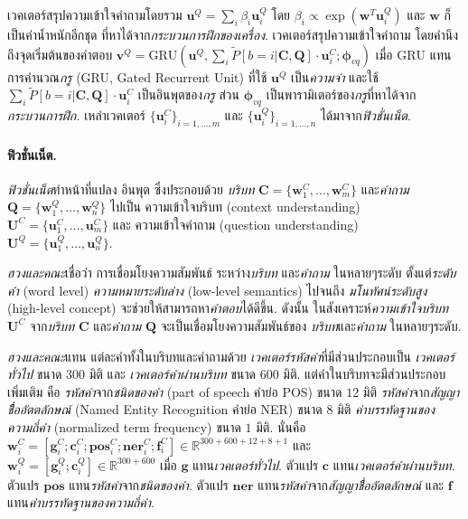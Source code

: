 เวคเตอร์สรุปความเข้าใจคำถามโดยรวม $\bm{u}^Q = \sum_i \beta_i \bm{u}_i^Q$ 
โดย $\beta_i \propto \exp{(\bm{w}^T \bm{u}_i^Q)}$
และ $\bm{w}$ ก็เป็นค่าน้ำหนักอีกชุด ที่หาได้จาก\textit{กระบวนการฝึกของเครื่อง}.
เวคเตอร์สรุปความเข้าใจคำถาม
โดยคำนึงถึงจุดเริ่มต้นของคำตอบ
$\bm{v}^Q = \mathrm{GRU}(\bm{u}^Q, \sum_i \tilde{P}[b=i|\bm{C}, \bm{Q}]
\cdot
 \bm{u}_i^C; \bm{\phi}_{vq})$
เมื่อ $\mathrm{GRU}$ แทนการคำนวณ\textit{กรู} (GRU, Gated Recurrent Unit\cite{ChoEtAl2014a})
ที่ใช้ $\bm{u}^Q$ เป็น\textit{ความจำ}
และใช้ $\sum_i \tilde{P}[b=i|\bm{C}, \bm{Q}] \cdot \bm{u}_i^C$ เป็นอินพุตของ\textit{กรู}
ส่วน $\bm{\phi}_{vq}$ %
%
เป็นพารามิเตอร์ของ\textit{กรู}ที่หาได้จาก\textit{กระบวนการฝึก.
}
%
เหล่าเวคเตอร์ $\{\bm{u}_i^C\}_{i=1, \ldots, m}$ และ
$\{\bm{u}_i^Q\}_{i=1, \ldots, n}$
ได้มาจาก\textit{ฟิวชั่นเน็ต}.

\paragraph{ฟิวชั่นเน็ต.}
\textit{ฟิวชั่นเน็ต}ทำหน้าที่แปลง
อินพุต ซึ่งประกอบด้วย
\textit{บริบท} $\bm{C} = \{\bm{w}_1^C, \ldots, \bm{w}_m^C \}$
และ\textit{คำถาม} $\bm{Q} = \{\bm{w}_1^Q, \ldots, \bm{w}_n^Q \}$
ไปเป็น
ความเข้าใจบริบท  (context understanding)
$\bm{U}^C = \{\bm{u}^C_1, \ldots, \bm{u}^C_m \}$
และ
ความเข้าใจคำถาม 
(question understanding) 
$\bm{U}^Q = \{\bm{u}^Q_1, \ldots, \bm{u}^Q_n \}$.

\textit{ฮวงและคณะ}\cite{HuangEtAl2017a}เชื่อว่า
การเชื่อมโยงความสัมพันธ์
ระหว่าง\textit{บริบท}
และ\textit{คำถาม}
ในหลายๆระดับ 
ตั้งแต่\textit{ระดับคำ} (word level)
\textit{ความหมายระดับล่าง} (low-level  semantics)
ไปจนถึง
\textit{มโนทัศน์ระดับสูง} (high-level concept)
จะช่วยให้สามารถหา\textit{คำตอบ}ได้ดีขึ้น.
%
ดังนั้น
ในสังเคราะห์\textit{ความเข้าใจบริบท}
$\bm{U}^C$
จาก\textit{บริบท} $\bm{C}$ 
และ\textit{คำถาม} $\bm{Q}$
จะเป็นเชื่อมโยงความสัมพันธ์ของ
\textit{บริบท}และ\textit{คำถาม}
ในหลายๆระดับ.

\textit{ฮวงและคณะ}แทน แต่ละคำทั้งในบริบทและคำถามด้วย
\textit{เวคเตอร์รหัสคำ}ที่มีส่วนประกอบเป็น
\textit{เวคเตอร์ทั่วไป}\cite{PSM2014a}
ขนาด $300$ มิติ
และ
\textit{เวคเตอร์คำผ่านบริบท}\cite{McCannEtAl2017a} ขนาด $600$ มิติ.
แต่คำในบริบทจะมีส่วนประกอบเพิ่มเติม คือ
\textit{รหัสคำ}จาก\textit{ชนิดของคำ} (part of speech คำย่อ POS) ขนาด $12$ มิติ
\textit{รหัสคำ}จาก\textit{สัญญาชืื่ออัตตลักษณ์} (Named Entity Recognition คำย่อ NER) ขนาด $8$ มิติ
\textit{ค่าบรรทัดฐานของความถี่คำ} (normalized term frequency) ขนาด $1$ มิติ.
นั่นคือ
$\bm{w}_i^C = [\bm{g}_i^C; \bm{c}_i^C; \bm{pos}_i^C; \bm{ner}_i^C; \bm{f}_i^C] \in \mathbb{R}^{300+600+12+8+1}$
และ
$\bm{w}_i^Q = [\bm{g}_i^Q; \bm{c}_i^Q] \in \mathbb{R}^{300+600}$
เมื่อ $\bm{g}$ แทน\textit{เวคเตอร์ทั่วไป}\cite{PSM2014a}.
ตัวแปร $\bm{c}$ แทน\textit{เวคเตอร์คำผ่านบริบท}\cite{McCannEtAl2017a}.
ตัวแปร $\bm{pos}$ แทน\textit{รหัสคำ}จาก\textit{ชนิดของคำ}.
ตัวแปร $\bm{ner}$ แทน\textit{รหัสคำ}จาก\textit{สัญญาชืื่ออัตตลักษณ์}
และ $\bm{f}$ แทน\textit{ค่าบรรทัดฐานของความถี่คำ}.

